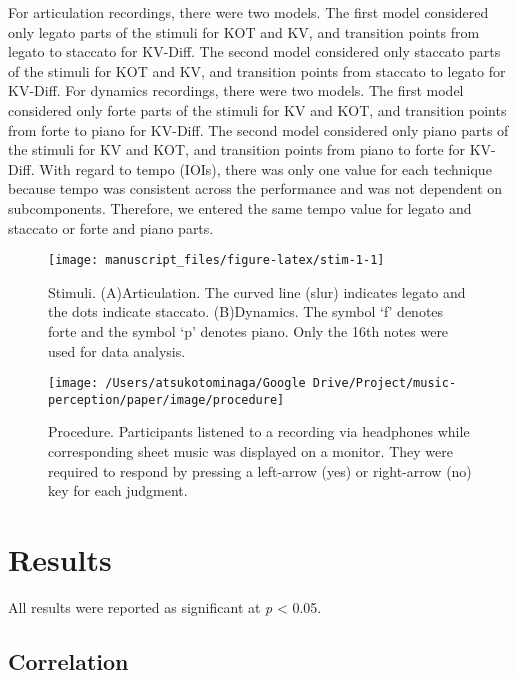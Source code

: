 \documentclass[
  man,floatsintext]{apa6}
\begin{document}
For articulation recordings, there were two models. The first model considered only legato parts of the stimuli for KOT and KV, and transition points from legato to staccato for KV-Diff. The second model considered only staccato parts of the stimuli for KOT and KV, and transition points from staccato to legato for KV-Diff. For dynamics recordings, there were two models. The first model considered only forte parts of the stimuli for KV and KOT, and transition points from forte to piano for KV-Diff. The second model considered only piano parts of the stimuli for KV and KOT, and transition points from piano to forte for KV-Diff. With regard to tempo (IOIs), there was only one value for each technique because tempo was consistent across the performance and was not dependent on subcomponents. Therefore, we entered the same tempo value for legato and staccato or forte and piano parts.

\begin{figure}
\texttt{[image: manuscript\_files/figure-latex/stim-1-1]} \caption{\label{fig:stim1}Stimuli. (A)Articulation. The curved line (slur) indicates legato and the dots indicate staccato. (B)Dynamics. The symbol `f' denotes forte and the symbol `p' denotes piano. Only the 16th notes were used for data analysis.}\label{fig:stim-1}
\end{figure}

\begin{figure}
\texttt{[image: /Users/atsukotominaga/Google Drive/Project/music-perception/paper/image/procedure]} \caption{\label{fig:procedure1}Procedure. Participants listened to a recording via headphones while corresponding sheet music was displayed on a monitor. They were required to respond by pressing a left-arrow (yes) or right-arrow (no) key for each judgment.}\label{fig:procedure-1}
\end{figure}

\clearpage

\hypertarget{results}{%
\section{Results}\label{results}}

All results were reported as significant at \emph{p} \textless{} 0.05.

\hypertarget{correlation}{%
\subsection{Correlation}\label{correlation}}
\end{document}
